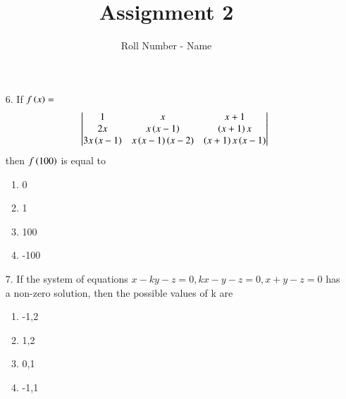 \documentclass[journal,12pt,twocolumn]{IEEEtran}
\theoremstyle{remark}
\begin{document}

\vspace{3cm}

\title{Assignment 2}
\author{Roll Number - Name}
\maketitle
\newpage
\bigskip

\renewcommand{\thefigure}{\theenumi}
\renewcommand{\thetable}{\theenumi}

\begin{enumerate}
	\item[6.] If $ f\left(x\right) = $
		\begin{align*}
		\begin{vmatrix}
		1 & x & x+1 \\
		2x & x\left(x-1\right) & \left(x+1\right)x \\
		3x\left(x-1\right) & x\left(x-1\right)\left(x-2\right) & \left(x+1\right)x\left(x-1\right)
		\end{vmatrix} \end{align*} then $f\left(100\right)$ is equal to 
			\hfill{}
	\begin{multicols}{4}
		\begin{enumerate}[label = (\alph*)]
			\item 0 
			\columnbreak
			\item 1
			\columnbreak
			\item 100
			\columnbreak
			\item -100
		\end{enumerate}
	\end{multicols}

	\item[7.] If the system of equations $x-ky-z=0, kx-y-z=0,x+y-z=0$ has a non-zero  solution,  then the possible values of k are 
		\hfill{}
	\begin{multicols}{4}
		\begin{enumerate}[label = (\alph*)]
			\item -1,2 \columnbreak
			\item 1,2 \columnbreak
			\item 0,1 \columnbreak
			\item -1,1
		\end{enumerate}
	\end{multicols}



\end{enumerate}
\end{document}
